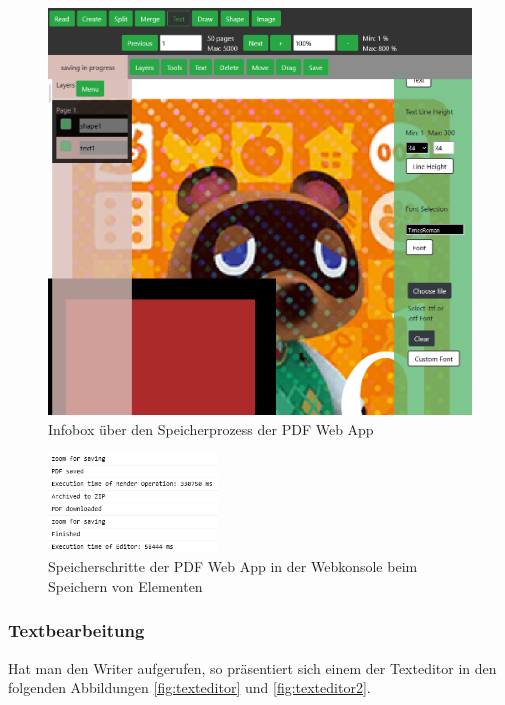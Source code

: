 \begin{figure}[!htbp]
	\centering
	\includegraphics[width=1\textwidth]{"images/save-info.png"}
	\caption{Infobox über den Speicherprozess der PDF Web App}
	\label{fig:save-info}
\end{figure}

\begin{figure}[!htbp]
	\centering
	\includegraphics[width=0.4\textwidth]{"images/save-progress-steps.png"}
	\caption{Speicherschritte der PDF Web App in der Webkonsole beim Speichern von Elementen}
	\label{fig:save-progress-steps}
\end{figure}

\subsubsection{Textbearbeitung}
Hat man den Writer aufgerufen, so präsentiert sich einem der Texteditor in den folgenden Abbildungen \ref{fig:texteditor} und \ref{fig:texteditor2}.

